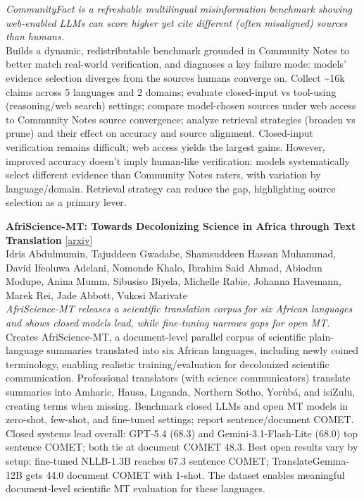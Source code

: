 \documentclass[12pt,letterpaper]{article}
\begin{document}
{\small\textit{CommunityFact is a refreshable multilingual misinformation benchmark showing web-enabled LLMs can score higher yet cite different (often misaligned) sources than humans.}}\\[1pt]
{\footnotesize Builds a dynamic, redistributable benchmark grounded in Community Notes to better match real-world verification, and diagnoses a key failure mode: models' evidence selection diverges from the sources humans converge on. Collect \textasciitilde{}16k claims across 5 languages and 2 domains; evaluate closed-input vs tool-using (reasoning/web search) settings; compare model-chosen sources under web access to Community Notes source convergence; analyze retrieval strategies (broaden vs prune) and their effect on accuracy and source alignment. Closed-input verification remains difficult; web access yields the largest gains. However, improved accuracy doesn't imply human-like verification: models systematically select different evidence than Community Notes raters, with variation by language/domain. Retrieval strategy can reduce the gap, highlighting source selection as a primary lever.}

\medskip

{\small\textbf{AfriScience-MT: Towards Decolonizing Science in Africa through Text Translation}} {\scriptsize[\href{https://arxiv.org/abs/2605.29741}{arxiv}]}\\
{\scriptsize Idris Abdulmumin, Tajuddeen Gwadabe, Shamsuddeen Hassan Muhammad, David Ifeoluwa Adelani, Nomonde Khalo, Ibrahim Said Ahmad, Abiodun Modupe, Anina Mumm, Sibusiso Biyela, Michelle Rabie, Johanna Havemann, Marek Rei, Jade Abbott, Vukosi Marivate}\\

{\small\textit{AfriScience-MT releases a scientific translation corpus for six African languages and shows closed models lead, while fine-tuning narrows gaps for open MT.}}\\[1pt]
{\footnotesize Creates AfriScience-MT, a document-level parallel corpus of scientific plain-language summaries translated into six African languages, including newly coined terminology, enabling realistic training/evaluation for decolonized scientific communication. Professional translators (with science communicators) translate summaries into Amharic, Hausa, Luganda, Northern Sotho, Yorùbá, and isiZulu, creating terms when missing. Benchmark closed LLMs and open MT models in zero-shot, few-shot, and fine-tuned settings; report sentence/document COMET. Closed systems lead overall: GPT-5.4 (68.3) and Gemini-3.1-Flash-Lite (68.0) top sentence COMET; both tie at document COMET 48.3. Best open results vary by setup: fine-tuned NLLB-1.3B reaches 67.3 sentence COMET; TranslateGemma-12B gets 44.0 document COMET with 1-shot. The dataset enables meaningful document-level scientific MT evaluation for these languages.}
\end{document}
